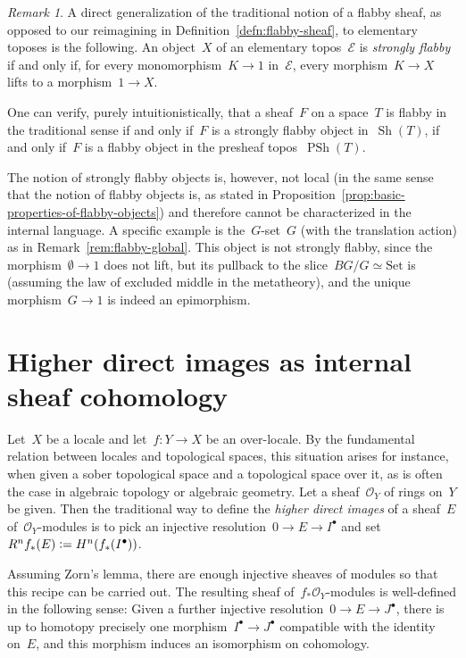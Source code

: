 \documentclass[oneside]{amsart}
\theoremstyle{definition}
\theoremstyle{plain}
\theoremstyle{remark}
\newtheorem{rem}[defn]{Remark}
\newcommand{\E}{\mathcal{E}}
\renewcommand{\O}{\mathcal{O}}
\newcommand{\defeq}{\vcentcolon=}
\DeclareMathOperator{\Sh}{Sh}
\DeclareMathOperator{\PSh}{PSh}
\newcommand{\Set}{\mathrm{Set}}
\renewcommand{\_}{\mathpunct{.}\,}
\begin{document}
\begin{rem}A direct generalization of the traditional notion of a flabby sheaf, as
opposed to our reimagining in Definition~\ref{defn:flabby-sheaf}, to
elementary toposes is the following. An object~$X$ of an elementary topos~$\E$
is \emph{strongly flabby} if and only if, for every monomorphism~$K \to 1$
in~$\E$, every morphism~$K \to X$ lifts to a morphism~$1 \to X$.

One can verify, purely intuitionistically, that a sheaf~$F$ on a space~$T$ is
flabby in the traditional sense if and only if~$F$ is a strongly flabby object
in~$\Sh(T)$, if and only if~$F$ is a flabby object in the presheaf
topos~$\PSh(T)$.

The notion of strongly flabby objects is, however, not local (in the same sense
that the notion of flabby objects is, as stated in
Proposition~\ref{prop:basic-properties-of-flabby-objects})
and therefore cannot be characterized in the internal language. A specific
example is the~$G$-set~$G$ (with the translation action) as in
Remark~\ref{rem:flabby-global}.
This object is not strongly flabby, since the morphism~$\emptyset \to 1$ does
not lift, but its pullback to the slice~$BG/G \simeq \Set$ is (assuming
the law of excluded middle in the metatheory), and the unique morphism~$G \to
1$ is indeed an epimorphism.
\end{rem}


\section{Higher direct images as internal sheaf cohomology}
\label{sect:higher-direct-images}

Let~$X$ be a locale and let~$f : Y \to X$ be an over-locale. By the fundamental
relation between locales and topological spaces, this situation arises
for instance, when given a sober topological space and a topological
space over it, as is often the case in algebraic topology or algebraic
geometry. Let a sheaf~$\O_Y$ of rings on~$Y$ be given. Then the
traditional way to define the \emph{higher direct images} of a sheaf~$E$
of~$\O_Y$-modules is to pick an injective resolution~$0 \to E \to I^\bullet$
and set~$R^n f_*(E) \defeq H^n(f_*(I^\bullet))$.

Assuming Zorn's lemma, there are enough injective sheaves of modules so
that this recipe can be carried out. The resulting sheaf
of~$f_*\O_Y$-modules is well-defined in the following sense: Given a further
injective resolution~$0 \to E \to J^\bullet$, there is up to homotopy precisely
one morphism~$I^\bullet \to J^\bullet$ compatible with the identity on~$E$, and
this morphism induces an isomorphism on cohomology.
\end{document}
